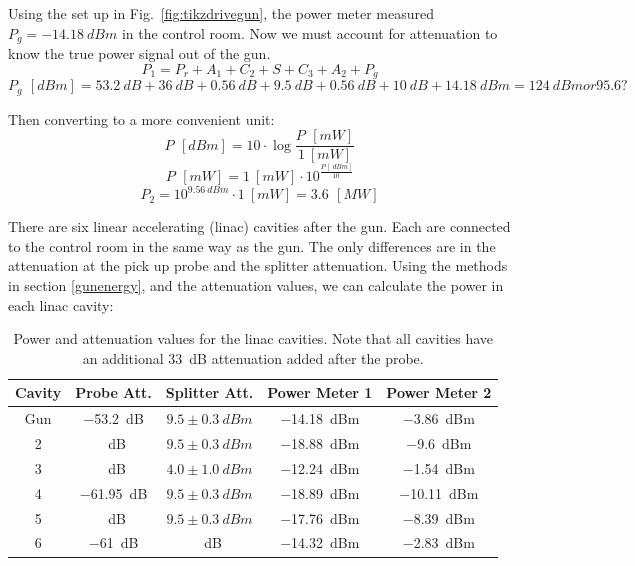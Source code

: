 \fi

Using the set up in Fig.~\ref{fig:tikzdrivegun}, the power meter measured  $P_{g} = \SI{-14.18}{dBm}$
in the control room. Now we must account for attenuation to know the true power
signal out of the gun. 
\begin{equation}
P_1 = P_r + A_1 + C_2 + S + C_3 + A_2 + P_g
\end{equation}
\begin{equation}
P_g \, \SI{}{[dBm]} = \SI{53.2}{dB} + \SI{36}{dB} + \SI{0.56}{dB} + \SI{9.5}{dB}+ \SI{0.56}{dB} + \SI{10}{dB} + \SI{14.18}{dBm} = \SI{124}{dBm} or 95.6?
\end{equation}

Then converting to a more convenient unit: 
\begin{equation}
P \, \SI{}{[dBm]} = 10 \cdot \log{\frac{P \, \SI{}{[mW]}}{\SI{1}{[mW]}}}
\end{equation}
\begin{equation} \label{eq:dbmtomw}
P \, \SI{}{[mW]} = \SI{1}{[mW]} \cdot 10^{\frac{P \, [\SI{}{dBm}]}{\SI{10}{}}}
\end{equation}
\begin{equation} 
P_2 = 10^{\SI{9.56}{dBm}} \cdot  \SI{1}{[mW]} = 3.6 \, \SI{}{[MW]} 
\end{equation}

There are six linear accelerating (linac) cavities after the gun. 
Each are connected to the control room in the same way as the gun. 
The only differences are in the attenuation at the pick up probe and 
the splitter attenuation. Using the methods in section \ref{gunenergy}, 
and the attenuation values, we can calculate the power in each linac cavity:

\begin{table} %
	\caption{\label{tab:powerlinac} Power and attenuation values for the 
		linac cavities. Note that all cavities have an additional 
		\SI{33}{dB} attenuation added after the probe.}
	\begin{center}
		\begin{tabular}{ccccc}
			\toprule
			\textbf{Cavity} & \textbf{Probe Att.} & \textbf{Splitter Att.} & \textbf{Power Meter 1}  & \textbf{Power Meter 2} \\
			\midrule
			Gun & \SI{-53.2}{dB}& $9.5 \pm \SI{0.3}{dBm}$ & \SI{-14.18}{dBm} & \SI{-3.86}{dBm}  \\
			2 & \SI{}{dB}       & $9.5 \pm \SI{0.3}{dBm}$ & \SI{-18.88}{dBm} & \SI{-9.6}{dBm}  \\
			3 & \SI{}{dB}       & $4.0 \pm \SI{1.0}{dBm}$ & \SI{-12.24}{dBm} & \SI{-1.54}{dBm}  \\
			4 & \SI{-61.95}{dB} & $9.5 \pm \SI{0.3}{dBm}$ & \SI{-18.89}{dBm} & \SI{-10.11}{dBm}  \\
			5 & \SI{}{dB}       & $9.5 \pm \SI{0.3}{dBm}$ & \SI{-17.76}{dBm} & \SI{-8.39}{dBm}  \\
			6 & \SI{-61}{dB}    & \SI{}{dB} 			  & \SI{-14.32}{dBm} & \SI{-2.83}{dBm} \\
			\bottomrule
		\end{tabular}
	\end{center}
\end{table}

